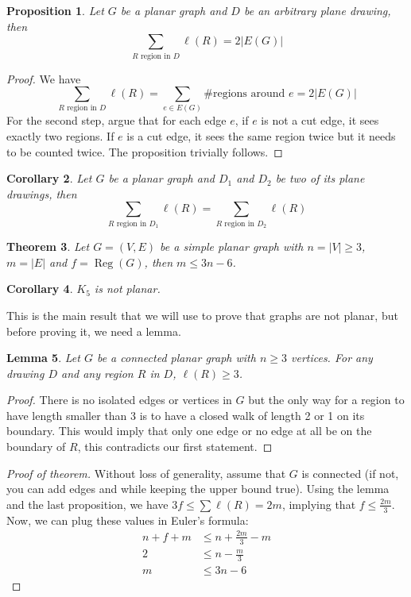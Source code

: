 \documentclass{tufte-handout}
\newtheorem{thm}{Theorem}
\newtheorem{cor}[thm]{Corollary}
\newtheorem{prop}[thm]{Proposition}
\newtheorem{lem}[thm]{Lemma}
\theoremstyle{definition}
\theoremstyle{remark}
\DeclareMathOperator{\reg}{Reg}
\begin{document}
\begin{prop}
	Let $G$ be a planar graph and $D$ be an arbitrary plane drawing, then
\[ \sum_{R \mbox{ region in } D} \ell(R) = 2|E(G)| \]
\end{prop}
\begin{proof}
    We have \[\sum_{R \mbox{ region in } D} \ell(R) = \sum_{e \in E(G)} \mbox{\#regions around } e = 2|E(G)|\]
	For the second step, argue that for each edge $e$, if $e$ is not a cut edge, it sees exactly two regions. If $e$ is a cut edge, it sees the same region twice but it needs to be counted twice. The proposition trivially follows.
\end{proof}
\begin{cor}
		Let $G$ be a planar graph and $D_1$ and $D_2$ be two of its plane drawings, then
	\[ \sum_{R \mbox{ region in } D_1} \ell(R) = \sum_{R \mbox{ region in } D_2} \ell(R)\]
\end{cor}
\begin{thm}
	Let $G= (V,E)$ be a simple planar graph with $n = |V| \geq 3$, $m = |E|$ and $f = \reg(G)$, then $m \leq 3n-6$.
\end{thm}
\begin{cor}
	$K_5$ is not planar.
\end{cor}
This is the main result that we will use to prove that graphs are not planar, but before proving it, we need a lemma.
\begin{lem}
	Let $G$ be a connected planar graph with $n \geq 3$ vertices. For any drawing $D$ and any region $R$ in $D$, $\ell(R) \geq 3$.
\end{lem}
\begin{proof}
	There is no isolated edges or vertices in $G$ but the only way for a region to have length smaller than 3 is to have a closed walk of length 2 or 1 on its boundary. This would imply that only one edge or no edge at all be on the boundary of $R$, this contradicts our first statement.
\end{proof}
\begin{proof}[Proof of theorem]
	Without loss of generality, assume that $G$ is connected (if not, you can add edges and while keeping the upper bound true). Using the lemma and the last proposition, we have $3f \leq \sum \ell(R) = 2m$, implying that $f \leq \frac{2m}{3}$. Now, we can plug these values in Euler's formula:
	\begin{align*}
		n+f+m &\leq n + \frac{2m}{3} - m\\
		2 &\leq n-\frac{m}{3}\\
		m &\leq 3n - 6
	\end{align*}
\end{proof}
\end{document}
